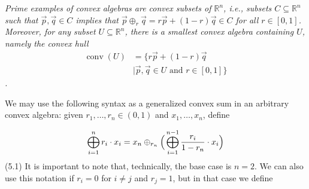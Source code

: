 \documentclass[11pt,a4paper]{amsart}
\begin{document}
\hypertarget{html:S5.Thmtheorem1.p1}{} \emph{Prime examples of convex algebras are \emph{convex} subsets of %
\hypertarget{html:S5.Thmtheorem1.p1.m1}{}\({\mathbb{R}^{n}}\), i.e., subsets %
\hypertarget{html:S5.Thmtheorem1.p1.m2}{}\({C\subseteq\mathbb{R}^{n}}\) such that %
\hypertarget{html:S5.Thmtheorem1.p1.m3}{}\({\vec{p},\vec{q}\in C}\) implies that %
\hypertarget{html:S5.Thmtheorem1.p1.m4}{}\({\vec{p}\oplus_{r}\vec{q}=r\vec{p}+(1-r)\vec{q}\in C}\) for all %
\hypertarget{html:S5.Thmtheorem1.p1.m5}{}\({r\in[0,1]}\). Moreover, for any subset %
\hypertarget{html:S5.Thmtheorem1.p1.m6}{}\({U\subseteq\mathbb{R}^{n}}\), there is a smallest convex algebra containing %
\hypertarget{html:S5.Thmtheorem1.p1.m7}{}\({U}\), namely the \emph{convex hull} %
\hypertarget{html:S5.Thmtheorem1.p1.m8}{}\[\begin{aligned}\operatorname{conv}(U)&=\{r\vec{p}+(1-r)\vec{q}\\&\mid\vec{p},\vec{q}\in U\text{ and }r\in[0,1]\}\end{aligned}\].}
\par\medskip
\hypertarget{html:S5.SS0.SSS0.P0.SPx1.p2}{} We may use the following syntax as a generalized convex sum in an arbitrary convex algebra: given %
\hypertarget{html:S5.SS0.SSS0.P0.SPx1.p2.m1}{}\({r_{1},\dots,r_{n}\in(0,1)}\) and %
\hypertarget{html:S5.SS0.SSS0.P0.SPx1.p2.m2}{}\({x_{1},\dots,x_{n}}\), define
\par\medskip
\hypertarget{html:S5.E1}{}   %
\hypertarget{html:S5.E1.m1}{}\[\bigoplus_{i=1}^{n}r_{i}\cdot x_{i}=x_{n}\oplus_{r_{n}}\Big{(}\bigoplus_{i=1}^{n-1}\frac{r_{i}}{1-r_{n}}\cdot x_{i}\Big{)}\]  (5.1)   It is important to note that, technically, the base case is %
\hypertarget{html:S5.SS0.SSS0.P0.SPx1.p2.m3}{}\({n=2}\). We can also use this notation if %
\hypertarget{html:S5.SS0.SSS0.P0.SPx1.p2.m4}{}\({r_{i}=0}\) for %
\hypertarget{html:S5.SS0.SSS0.P0.SPx1.p2.m5}{}\({i\neq j}\) and %
\hypertarget{html:S5.SS0.SSS0.P0.SPx1.p2.m6}{}\({r_{j}=1}\), but in that case we define %
\end{document}
